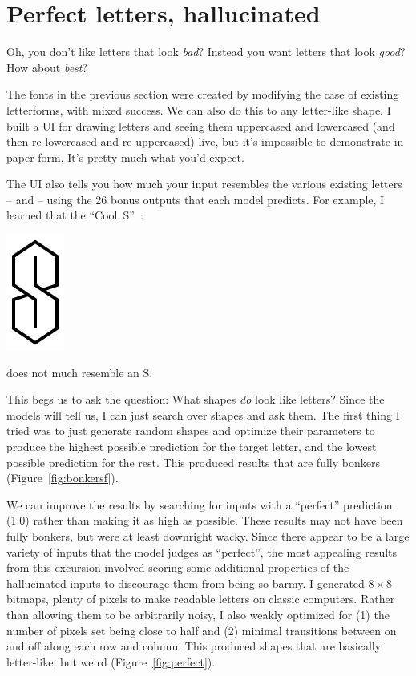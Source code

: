 \documentclass[twocolumn]{article}
\begin{document}
\section{Perfect letters, hallucinated} \label{sec:hallucination}

Oh, you don't like letters that look {\em bad}? Instead you want
letters that look {\em good}? How about {\em best}?

The fonts in the previous section were created by modifying the case
of existing letterforms, with mixed success. We can also do this to
any letter-like shape. I built a UI for drawing letters and seeing
them uppercased and lowercased (and then re-lowercased and
re-uppercased) live, but it's impossible to demonstrate in paper form.
It's pretty much what you'd expect.

The UI also tells you how much your input resembles the various
existing letters -- and
-- using the 26 bonus outputs that each
model predicts. For example, I learned that the
``Cool~S''~\cite{wikipediacools}:

\begin{center}
\includegraphics[width=0.1 \linewidth]{cools}
\end{center}

\noindent does not much resemble an S.

This begs us to ask the question: What shapes {\em do} look like
letters? Since the models will tell us, I can just search over shapes
and ask them. The first thing I tried was to just generate random
shapes and optimize their parameters to produce the highest possible
prediction for the target letter, and the lowest possible prediction
for the rest. This produced results that are fully bonkers
(Figure~\ref{fig:bonkersf}).

We can improve the results by searching for inputs with a ``perfect''
prediction (1.0) rather than making it as high as possible. These
results may not have been fully bonkers, but were at least downright
wacky. Since there appear to be a large variety of inputs that the
model judges as ``perfect'', the most appealing results from this
excursion involved scoring some additional properties of the
hallucinated inputs to discourage them from being so barmy. I
generated $8 \times 8$ bitmaps, plenty of pixels to make readable
letters on classic computers. Rather than allowing them to be
arbitrarily noisy, I also weakly optimized for (1) the number of
pixels set being close to half and (2) minimal transitions between on
and off along each row and column. This produced shapes that are
basically letter-like, but weird (Figure~\ref{fig:perfect}).
\end{document}
